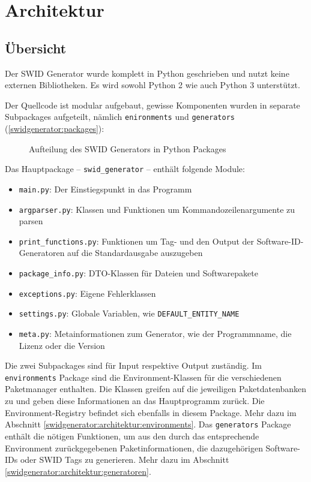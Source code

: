 
\section{Architektur}

\subsection{Übersicht}

Der SWID Generator wurde komplett in Python geschrieben und nutzt keine externen
Bibliotheken. Es wird sowohl Python 2 wie auch Python 3 unterstützt.

Der Quellcode ist modular aufgebaut, gewisse Komponenten wurden in separate
Subpackages aufgeteilt, nämlich \texttt{enironments} und \texttt{generators} (\autoref{swidgenerator:packages}):

\begin{figure}[H]
	\centering
	
	\caption{Aufteilung des SWID Generators in Python Packages}
	\label{swidgenerator:packages}
\end{figure}

Das Hauptpackage -- \texttt{swid\_generator} -- enthält folgende Module:

\begin{itemize}
	\item \texttt{main.py}: Der Einstiegspunkt in das Programm
	\item \texttt{argparser.py}: Klassen und Funktionen um
		Kommandozeilenargumente zu parsen
	\item \texttt{print\_functions.py}: Funktionen um Tag- und den Output der
		Software-ID-Generatoren auf die Standardausgabe auszugeben
	\item \texttt{package\_info.py}: DTO-Klassen für Dateien und Softwarepakete
	\item \texttt{exceptions.py}: Eigene Fehlerklassen
	\item \texttt{settings.py}: Globale Variablen, wie \zb
		\texttt{DEFAULT\_ENTITY\_NAME}
	\item \texttt{meta.py}: Metainformationen zum Generator, wie \zb der
		Programmname, die Lizenz oder die Version
\end{itemize}

Die zwei Subpackages sind für Input respektive Output zuständig. Im
\texttt{environments} Package sind die Environment-Klassen für die verschiedenen
Paketmanager enthalten. Die Klassen greifen auf die jeweiligen Paketdatenbanken
zu und geben diese Informationen an das Hauptprogramm zurück. Die
Environment-Registry befindet sich ebenfalls in diesem Package. Mehr dazu im
Abschnitt \ref{swidgenerator:architektur:environments}. Das \texttt{generators}
Package enthält die nötigen Funktionen, um aus den durch das entsprechende
Environment zurückgegebenen Paketinformationen, die dazugehörigen Software-IDs
oder SWID Tags zu generieren. Mehr dazu im Abschnitt
\ref{swidgenerator:architektur:generatoren}.

